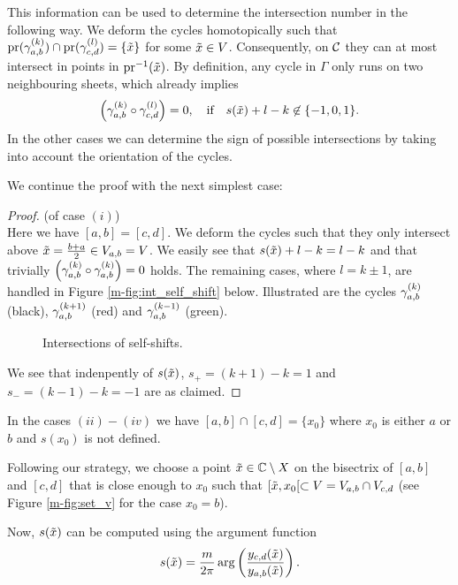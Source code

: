 \documentclass[main.tex]{subfiles}
\begin{document}
 This information can be used to determine the intersection number in the following way. We deform the cycles homotopically
 such that $\operatorname{pr}(\gamma_{a,b}^{(k)}) \cap \operatorname{pr}(\gamma_{c,d}^{(l)}) = \{ \tilde{x} \}$ for some $\tilde{x} \in V$. Consequently, on $\mathcal{C}$ they can at most intersect in
 points in $\operatorname{pr}^{-1}(\tilde{x})$. By definition, any cycle in $\Gamma$ only runs on two neighbouring sheets, which already implies
 \begin{equation}
   \left(\gamma_{a,b}^{(k)} \circ \gamma_{c,d}^{(l)}\right) = 0, \quad \text{if} \quad  s(\tilde{x})+l-k \not\in \{-1,0,1\}.
 \end{equation}
  In the other cases we can determine the
  sign of possible intersections by taking into account the orientation of the cycles.
  
 We continue the proof with the next simplest case:
 \begin{proof}\let\qed\relax (of case $(i)$) \\
 Here we have $[a,b] = [c,d]$. We deform the cycles such that they only intersect above
 $\tilde{x} = \frac{b+a}{2} \in  V_{a,b}= V$.
 We easily see that $s(\tilde{x}) + l - k = l - k$ and that trivially $\left( \gamma_{a,b}^{(k)} \circ \gamma_{a,b}^{(k)} \right) = 0$ holds. The remaining cases,
 where $l = k \pm 1$, are handled in Figure \ref{m-fig:int_self_shift} below.
   Illustrated are the cycles $\gamma_{a,b}^{(k)}$ (black),
      $\gamma_{a,b}^{(k+1)}$ (red) and $\gamma_{a,b}^{(k-1)}$ (green).
    \begin{figure}[H]
      \begin{center}
   
      \end{center}
    \caption{Intersections of self-shifts.}
    \label{fig:int_self_shift}
\end{figure}
  We see that indenpently of $s(\tilde{x})$, $s_+ = (k+1)-k = 1$ and $s_- = (k-1)-k = -1$ are as claimed.
 \end{proof}

  In the cases $(ii)-(iv)$ we have $[a,b] \cap [c,d] = \{ x_0 \}$ where $x_0$ is either $a$ or $b$ and $s(x_0)$ is not
  defined. 
  
 Following our strategy, we choose a point $\tilde{x} \in \mathbb{C} \setminus X$ on the bisectrix of
  $[a,b]$ and $[c,d]$ that is close enough to $x_0$ such that $[\tilde{x},x_0[ \subset V = V_{a,b} \cap V_{c,d}$ 
  (see Figure \ref{m-fig:set_v} for the case $x_0 = b$). 
  
  Now, $s(\tilde{x})$ can be computed using the argument function
  \begin{equation}\label{eq:sxt}
   s(\tilde{x}) = \frac{m}{2\pi} \arg \left( \frac{y_{c,d}(\tilde{x})}{y_{a,b}(\tilde{x})} \right).
  \end{equation}
   
\end{document}
